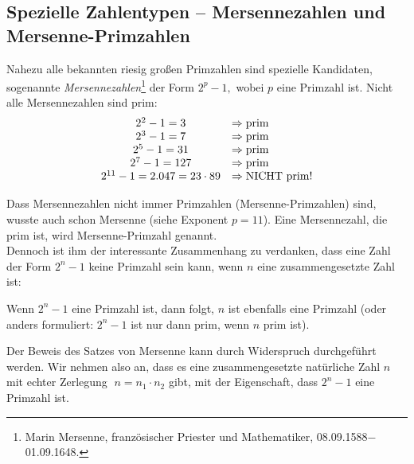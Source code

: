 \begin{refsegment}
\clearpage


\hypertarget{MersenneNumbers01}{}
\subsection{Spezielle Zahlentypen -- Mersennezahlen und Mersenne-Primzahlen}
\label{zahlentyp_mersenne}

Nahezu alle bekannten riesig großen Primzahlen sind spezielle
Kandidaten, sogenannte {\em Mersennezahlen}\footnote{%
Marin Mersenne, französischer Priester und Mathematiker,
08.09.1588$-$01.09.1648.
}
der Form $2^p -1,$ wobei $p$ eine Primzahl ist.
Nicht alle Mersennezahlen sind prim:
$$
\begin{array}{cl}
2^2 - 1 = 3 & \Rightarrow {\rm prim} \\
2^3 - 1 = 7 & \Rightarrow {\rm prim} \\
2^5 - 1 = 31    & \Rightarrow {\rm prim} \\
2^7 - 1 = 127    & \Rightarrow {\rm prim} \\
2^{11} - 1 = 2.047 = 23 \cdot 89    & \Rightarrow  {\rm NICHT~prim} !
\end{array}
$$


Dass Mersennezahlen nicht immer Primzahlen (Mersenne-Primzahlen) sind,
wusste auch schon Mersenne (siehe Exponent $p = 11$).
Eine Mersennezahl, die prim ist, wird Mersenne-Primzahl
 genannt.  \\

Dennoch ist ihm der interessante Zusammenhang zu verdanken, dass eine
Zahl der Form $2^n-1$ keine Primzahl sein kann, wenn $n$ eine
zusammengesetzte Zahl ist:

\begin{satz}[Mersenne]\label{thm-pz-mersenne}
  Wenn $2^n - 1$ eine Primzahl ist, dann folgt, $n$ ist ebenfalls eine
  Primzahl (oder anders formuliert: $2^n - 1$ ist nur dann prim,
  wenn $n$ prim ist).
\end{satz}

\begin{Beweis}{}
Der Beweis des Satzes von Mersenne kann durch Widerspruch
durchgeführt werden. Wir nehmen also an, dass es eine
zusammengesetzte natürliche Zahl $ n $ mit echter Zerlegung
$\; n=n_1 \cdot n_2 $
gibt, mit der Eigenschaft, dass $ 2^n -1 $ eine
Primzahl ist.


\end{Beweis}
\end{refsegment}

